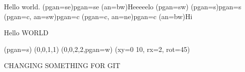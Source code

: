 \documentclass{corpboreport+}
\begin{document}
  Hello world.%
  \olay(pgan=se){\Large pgan=se} %
  \olay(an=bw){Heeeeelo}
  \olayxfm(pgan=sw)
  \olay(pgan=s){\Large pgan=s} %
  \olay(pgan=c, an=sw){\Large pgan=c} %
  \olay(pgan=c, an=ne){\Large pgan=c} %
  \olayxfm\olay(an=bw){Hi}

  Hello WORLD
  
  \olayxfm(pgan=s)
  \olaygrid
  \olaybox(0,0,1,1)
  \olaybox(0,0,2,2,pgan=w)
  \olaycirc(xy=0 10, rx=2, rot=45)
  

CHANGING SOMETHING FOR GIT
\end{document}
